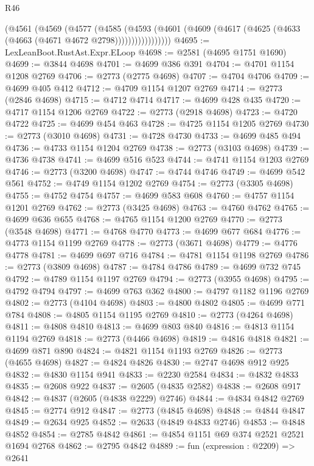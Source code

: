 \begin{lexlean}{R46}
\begin{coremodule}
              (@4561
                (@4569
                  (@4577
                    (@4585
                      (@4593
                        (@4601
                          (@4609 (@4617 (@4625 (@4633 (@4663 (@4671 @4672 @2798)))))))))))))))))
@4695 := LexLeanBoot.RustAst.Expr.ELoop
@4698 := @2581 (@4695 @1751 @1690)
@4699 := @3844 @4698
@4701 := @4699 @386 @391
@4704 := @4701 @1154 @1208 @2769
@4706 := @2773 (@2775 @4698)
@4707 := @4704 @4706
@4709 := @4699 @405 @412
@4712 := @4709 @1154 @1207 @2769
@4714 := @2773 (@2846 @4698)
@4715 := @4712 @4714
@4717 := @4699 @428 @435
@4720 := @4717 @1154 @1206 @2769
@4722 := @2773 (@2918 @4698)
@4723 := @4720 @4722
@4725 := @4699 @454 @463
@4728 := @4725 @1154 @1205 @2769
@4730 := @2773 (@3010 @4698)
@4731 := @4728 @4730
@4733 := @4699 @485 @494
@4736 := @4733 @1154 @1204 @2769
@4738 := @2773 (@3103 @4698)
@4739 := @4736 @4738
@4741 := @4699 @516 @523
@4744 := @4741 @1154 @1203 @2769
@4746 := @2773 (@3200 @4698)
@4747 := @4744 @4746
@4749 := @4699 @542 @561
@4752 := @4749 @1154 @1202 @2769
@4754 := @2773 (@3305 @4698)
@4755 := @4752 @4754
@4757 := @4699 @583 @608
@4760 := @4757 @1154 @1201 @2769
@4762 := @2773 (@3425 @4698)
@4763 := @4760 @4762
@4765 := @4699 @636 @655
@4768 := @4765 @1154 @1200 @2769
@4770 := @2773 (@3548 @4698)
@4771 := @4768 @4770
@4773 := @4699 @677 @684
@4776 := @4773 @1154 @1199 @2769
@4778 := @2773 (@3671 @4698)
@4779 := @4776 @4778
@4781 := @4699 @697 @716
@4784 := @4781 @1154 @1198 @2769
@4786 := @2773 (@3809 @4698)
@4787 := @4784 @4786
@4789 := @4699 @732 @745
@4792 := @4789 @1154 @1197 @2769
@4794 := @2773 (@3955 @4698)
@4795 := @4792 @4794
@4797 := @4699 @763 @362
@4800 := @4797 @1182 @1196 @2769
@4802 := @2773 (@4104 @4698)
@4803 := @4800 @4802
@4805 := @4699 @771 @784
@4808 := @4805 @1154 @1195 @2769
@4810 := @2773 (@4264 @4698)
@4811 := @4808 @4810
@4813 := @4699 @803 @840
@4816 := @4813 @1154 @1194 @2769
@4818 := @2773 (@4466 @4698)
@4819 := @4816 @4818
@4821 := @4699 @871 @890
@4824 := @4821 @1154 @1193 @2769
@4826 := @2773 (@4655 @4698)
@4827 := @4824 @4826
@4830 := @2747 @4698 @912 @925
@4832 := @4830 @1154 @941
@4833 := @2230 @2584
@4834 := @4832 @4833
@4835 := @2608 @922
@4837 := @2605 (@4835 @2582)
@4838 := @2608 @917
@4842 := @4837 (@2605 (@4838 @2229) @2746)
@4844 := @4834 @4842 @2769
@4845 := @2774 @912
@4847 := @2773 (@4845 @4698)
@4848 := @4844 @4847
@4849 := @2634 @925
@4852 := @2633 (@4849 @4833 @2746)
@4853 := @4848 @4852
@4854 := @2785 @4842
@4861 := @4854 @1151 @69 @374 @2521 @2521 @1694 @2768
@4862 := @2795 @4842
@4889 := fun (expression : @2209) =>
  @2641

\end{coremodule}
\end{lexlean}
